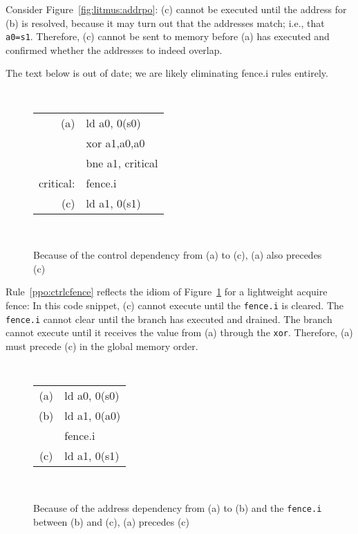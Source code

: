 Consider Figure~\ref{fig:litmus:addrpo}:
(c) cannot be executed until the address for (b) is resolved, because it may turn out that the addresses match; i.e., that {\tt a0=s1}.  Therefore, (c) cannot be sent to memory before (a) has executed and confirmed whether the addresses to indeed overlap.

\begin{tentative}
  The text below is out of date; we are likely eliminating fence.i rules entirely.
\end{tentative}

\begin{figure}[h!]
  \centering
  {
    \tt\small
    \begin{tabular}{rl}
    (a)       & ld a0, 0(s0) \\
              & xor a1,a0,a0 \\
              & bne a1, critical \\
    critical: & fence.i \\
    (c)       & ld a1, 0(s1) \\
    \end{tabular}
  }
  ~~~~
  \diagram
  \caption{Because of the control dependency from (a) to (c), (a) also precedes (c)}
  \label{fig:litmus:ctrlcfence}
\end{figure}

Rule~\ref{ppo:ctrlcfence} reflects the idiom of Figure~\ref{fig:litmus:ctrlcfence} for a lightweight acquire fence:
In this code snippet, (c) cannot execute until the {\tt fence.i} is cleared.  The {\tt fence.i} cannot clear until the branch has executed and drained.  The branch cannot execute until it receives the value from (a) through the {\tt xor}.  Therefore, (a) must precede (c) in the global memory order.

\begin{figure}[h!]
  \centering
  {
    \tt\small
    \begin{tabular}{cl}
    (a)       & ld a0, 0(s0) \\
    (b)       & ld a1, 0(a0) \\
              & fence.i \\
    (c)       & ld a1, 0(s1) \\
    \end{tabular}
  }
  ~~~~
  \diagram
  \caption{Because of the address dependency from (a) to (b) and the {\tt fence.i} between (b) and (c), (a) precedes (c)}
  \label{fig:litmus:addrpocfence}
\end{figure}

